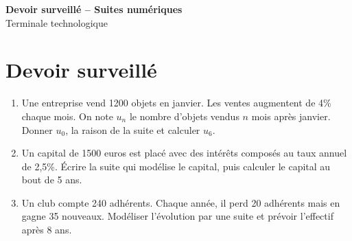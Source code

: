 \documentclass[french,11pt]{book}
\begin{document}
\begin{center}
{\Large \textbf{Devoir surveillé -- Suites numériques}}\\[2mm]
Terminale technologique
\end{center}

\section*{Devoir surveillé}
\begin{enumerate}
  \item Une entreprise vend 1200 objets en janvier. Les ventes augmentent de 4\% chaque mois. On note $u_n$ le nombre d'objets vendus $n$ mois après janvier. Donner $u_0$, la raison de la suite et calculer $u_6$.
  \item Un capital de 1500 euros est placé avec des intérêts composés au taux annuel de 2,5\%. Écrire la suite qui modélise le capital, puis calculer le capital au bout de 5 ans.
  \item Un club compte 240 adhérents. Chaque année, il perd 20 adhérents mais en gagne 35 nouveaux. Modéliser l'évolution par une suite et prévoir l'effectif après 8 ans.
\end{enumerate}
\end{document}
